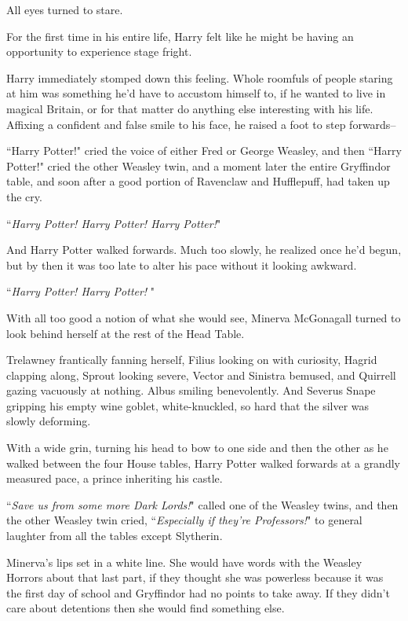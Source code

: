 All eyes turned to stare.

For the first time in his entire life, Harry felt like he might be having an opportunity to experience stage fright.

Harry immediately stomped down this feeling. Whole roomfuls of people staring at him was something he'd have to accustom himself to, if he wanted to live in magical Britain, or for that matter do anything else interesting with his life. Affixing a confident and false smile to his face, he raised a foot to step forwards\---

``Harry Potter!" cried the voice of either Fred or George Weasley, and then ``Harry Potter!" cried the other Weasley twin, and a moment later the entire Gryffindor table, and soon after a good portion of Ravenclaw and Hufflepuff, had taken up the cry.

``\emph{Harry Potter! Harry Potter! Harry Potter!}"

And Harry Potter walked forwards. Much too slowly, he realized once he'd begun, but by then it was too late to alter his pace without it looking awkward.

\later

``\emph{Harry Potter! Harry Potter! }"

With all too good a notion of what she would see, Minerva McGonagall turned to look behind herself at the rest of the Head Table.

Trelawney frantically fanning herself, Filius looking on with curiosity, Hagrid clapping along, Sprout looking severe, Vector and Sinistra bemused, and Quirrell gazing vacuously at nothing. Albus smiling benevolently. And Severus Snape gripping his empty wine goblet, white-knuckled, so hard that the silver was slowly deforming.

With a wide grin, turning his head to bow to one side and then the other as he walked between the four House tables, Harry Potter walked forwards at a grandly measured pace, a prince inheriting his castle.

``\emph{Save us from some more Dark Lords!}" called one of the Weasley twins, and then the other Weasley twin cried, ``\emph{Especially if they're Professors!}" to general laughter from all the tables except Slytherin.

Minerva's lips set in a white line. She would have words with the Weasley Horrors about that last part, if they thought she was powerless because it was the first day of school and Gryffindor had no points to take away. If they didn't care about detentions then she would find something else.

